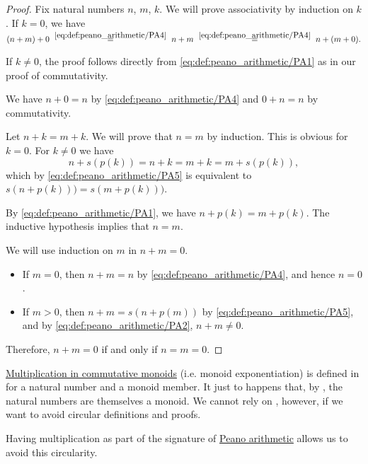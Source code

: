 \begin{proof}
   Fix natural numbers \( n \), \( m \), \( k \). We will prove associativity by induction on \( k \). If \( k = 0 \), we have
  \begin{equation*}
    (n + m) + 0
    \reloset {\eqref{eq:def:peano_arithmetic/PA4}} =
    n + m
    \reloset {\eqref{eq:def:peano_arithmetic/PA4}} =
    n + (m + 0).
  \end{equation*}

  If \( k \neq 0 \), the proof follows directly from \eqref{eq:def:peano_arithmetic/PA1} as in our proof of commutativity.

   We have \( n + 0 = n \) by \eqref{eq:def:peano_arithmetic/PA4} and \( 0 + n = n \) by commutativity.

   Let \( n + k = m + k \). We will prove that \( n = m \) by induction. This is obvious for \( k = 0 \). For \( k \neq 0 \) we have
  \begin{equation*}
    n + s(p(k))
    =
    n + k
    =
    m + k
    =
    m + s(p(k)),
  \end{equation*}
  which by \eqref{eq:def:peano_arithmetic/PA5} is equivalent to \( s(n + p(k))) = s(m + p(k))) \).

  By \eqref{eq:def:peano_arithmetic/PA1}, we have \( n + p(k) = m + p(k) \). The inductive hypothesis implies that \( n = m \).

   We will use induction on \( m \) in \( n + m = 0 \).
  \begin{itemize}
    \item If \( m = 0 \), then \( n + m = n \) by \eqref{eq:def:peano_arithmetic/PA4}, and hence \( n = 0 \).

    \item If \( m > 0 \), then \( n + m = s(n + p(m)) \) by \eqref{eq:def:peano_arithmetic/PA5}, and by \eqref{eq:def:peano_arithmetic/PA2}, \( n + m \neq 0 \).
  \end{itemize}

  Therefore, \( n + m = 0 \) if and only if \( n = m = 0 \).
\end{proof}

\begin{remark}\label{rem:natural_number_multiplication}
  \hyperref[con:additive_semigroup/multiplication]{Multiplication in commutative monoids} (i.e. monoid exponentiation) is defined in  for a natural number and a monoid member. It just to happens that, by , the natural numbers are themselves a monoid. We cannot rely on , however, if we want to avoid circular definitions and proofs.

  Having multiplication as part of the signature of \hyperref[def:peano_arithmetic]{Peano arithmetic} allows us to avoid this circularity.
\end{remark}

